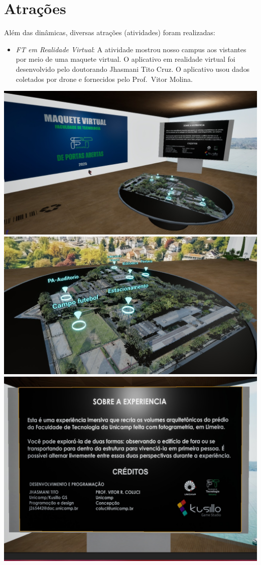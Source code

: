 \documentclass[
  letterpaper,
  DIV=11,
  numbers=noendperiod]{scrreprt}
\providecommand{\tightlist}{%
  \setlength{\itemsep}{0pt}\setlength{\parskip}{0pt}}\usepackage{longtable,booktabs,array}
\begin{document}
\section{Atrações}\label{atrauxe7uxf5es}

Além das dinâmicas, diversas atrações (atividades) foram realizadas:

\begin{itemize}
\tightlist
\item
  \emph{FT em Realidade Virtual}: A atividade mostrou nosso campus aos
  vistantes por meio de uma maquete virtual. O aplicativo em realidade
  virtual foi desenvolvido pelo doutorando Jhasmani Tito Cruz. O
  aplicativo usou dados coletados por drone e fornecidos pelo
  Prof.~Vitor Molina.
\end{itemize}

\includegraphics[width=0.6\linewidth,height=\textheight,keepaspectratio]{planejamento/maquete-virtual-1.jpg}
\includegraphics[width=0.6\linewidth,height=\textheight,keepaspectratio]{planejamento/maquete-virtual-2.jpg}
\includegraphics[width=0.6\linewidth,height=\textheight,keepaspectratio]{planejamento/maquete-virtual-3.jpg}
\end{document}
